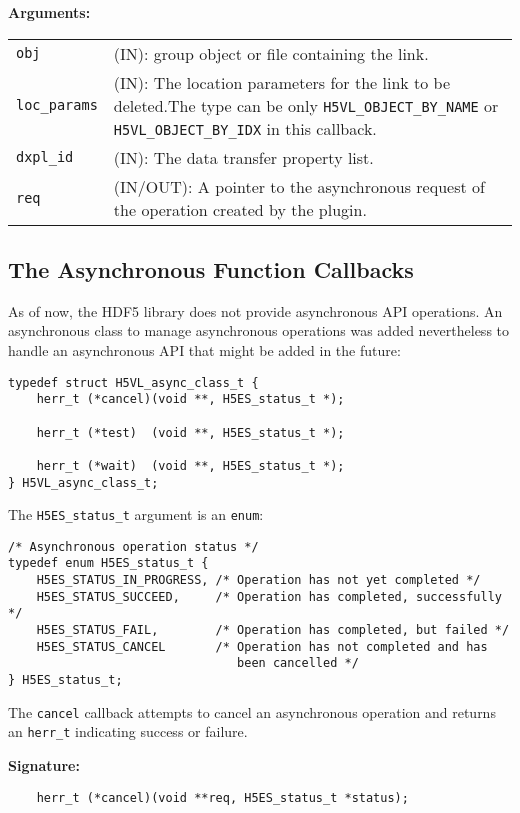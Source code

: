\textbf{Arguments:}\\
\begin{tabular}{l p{10cm}}
  {\tt obj} & (IN): group object or file containing the link.\\
  {\tt loc\_params} & (IN): The location parameters for the link to be
  deleted.The type can be only {\tt H5VL\_OBJECT\_BY\_NAME} or {\tt
    H5VL\_OBJECT\_BY\_IDX} in this callback.\\ 
  {\tt dxpl\_id} & (IN): The data transfer property list.\\
  {\tt req} & (IN/OUT): A pointer to the asynchronous request of the
  operation created by the plugin.\\
\end{tabular}

\subsection{The Asynchronous Function Callbacks}
As of now, the HDF5 library does not provide asynchronous API
operations. An asynchronous class to manage asynchronous operations
was added nevertheless to handle an asynchronous API that might be
added in the future:

\begin{lstlisting}
typedef struct H5VL_async_class_t {
    herr_t (*cancel)(void **, H5ES_status_t *);

    herr_t (*test)  (void **, H5ES_status_t *);

    herr_t (*wait)  (void **, H5ES_status_t *);
} H5VL_async_class_t;
\end{lstlisting}

The {\tt H5ES\_status\_t} argument is an {\tt enum}:
\begin{lstlisting}
/* Asynchronous operation status */
typedef enum H5ES_status_t {
    H5ES_STATUS_IN_PROGRESS, /* Operation has not yet completed */
    H5ES_STATUS_SUCCEED,     /* Operation has completed, successfully */
    H5ES_STATUS_FAIL,        /* Operation has completed, but failed */
    H5ES_STATUS_CANCEL       /* Operation has not completed and has
                                been cancelled */
} H5ES_status_t;
\end{lstlisting}

The {\tt cancel} callback attempts to cancel an asynchronous operation
and returns an {\tt herr\_t} indicating success or failure.

\textbf{Signature:}
\begin{lstlisting}
    herr_t (*cancel)(void **req, H5ES_status_t *status);
\end{lstlisting}

